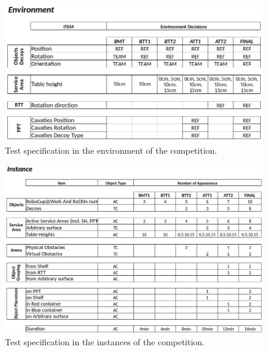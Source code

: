 \begin{figure}[h!]
	\centering
	\includegraphics[width= 1.0\textwidth ]{./images/tabels/robocup_env.png}
	\caption{Test specification in the environment of the \RCAW \YEAR competition.}
	\label{fig:test_specifications_environment}
\end{figure}

\begin{figure}[h!]
	\centering
	\includegraphics[width= 1.0\textwidth ]{./images/tabels/robocup_instance.jpg}
	\caption{Test specification in the instances of the \RCAW \YEAR competition.}
	\label{fig:test_specifications_instance}
\end{figure}



